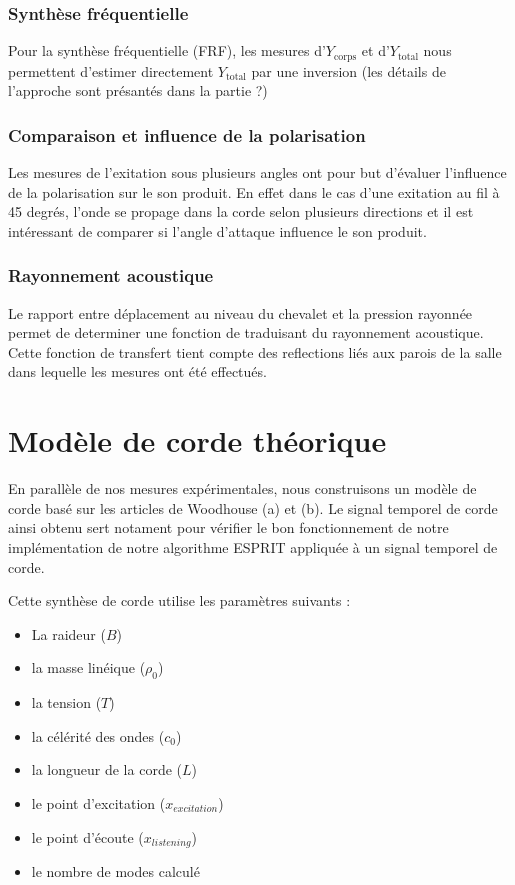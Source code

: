 \subsubsection{Synthèse fréquentielle}

Pour la synthèse fréquentielle (FRF), les mesures d'$Y_{\text{corps}}$ et
d'$Y_{\text{total}}$ nous permettent d'estimer directement $Y_{\text{total}}$
par une inversion (les détails de l'approche sont présantés dans la partie ?)

\subsubsection{Comparaison et influence de la polarisation}

Les mesures de l'exitation sous plusieurs angles ont pour but d'évaluer
l'influence de la polarisation sur le son produit.  En effet dans le cas d'une
exitation au fil à 45 degrés, l'onde se propage dans la corde selon plusieurs
directions et il est intéressant de comparer si  l'angle d'attaque influence le
son produit.

\subsubsection{Rayonnement acoustique}

Le rapport entre déplacement au niveau du chevalet et la pression rayonnée
permet de determiner une fonction de traduisant du rayonnement acoustique. 
Cette fonction de transfert tient compte des reflections liés aux parois 
de la salle dans lequelle les mesures ont été effectués.

\section{Modèle de corde théorique}
\label{sec:cordetheo}


En parallèle de nos mesures expérimentales, nous construisons un modèle de
corde basé sur les articles de Woodhouse (a) et (b). Le signal temporel de
corde ainsi obtenu sert notament pour vérifier le bon fonctionnement de notre
implémentation de notre algorithme ESPRIT appliquée à un signal temporel de
corde.

Cette synthèse de corde utilise les paramètres suivants : 

\begin{itemize}
\item La raideur ($B$)
\item la masse linéique ($\rho_0$)
\item la tension ($T$)
\item la célérité des ondes ($c_0$)
\item la longueur de la corde ($L$)
\item le point d'excitation ($x_{excitation}$)
\item le point d'écoute ($x_{listening}$)
\item le nombre de modes calculé
\end{itemize}

